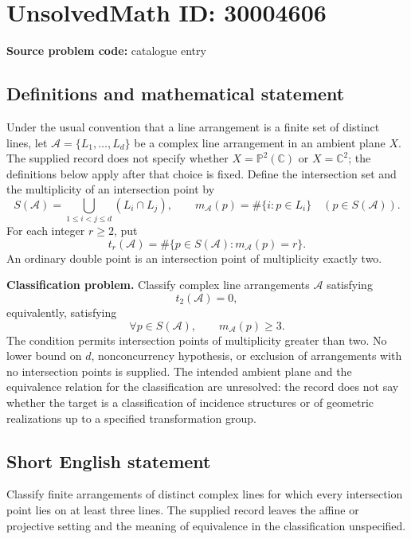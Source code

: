 \documentclass[11pt]{article}
\newcommand{\C}{\mathbb{C}}
\newcommand{\PP}{\mathbb{P}}
\begin{document}
\section*{UnsolvedMath ID: 30004606}
\textbf{Source problem code:} catalogue entry
\subsection{Definitions and mathematical statement}
Under the usual convention that a line arrangement is a finite set of distinct lines, let \(\mathcal A=\{L_1,\ldots,L_d\}\) be a complex line arrangement in an ambient plane \(X\). The supplied record does not specify whether \(X=\PP^2(\C)\) or \(X=\C^2\); the definitions below apply after that choice is fixed. Define the intersection set and the multiplicity of an intersection point by
\[
S(\mathcal A)=\bigcup_{1\le i<j\le d}(L_i\cap L_j),\qquad
m_{\mathcal A}(p)=\#\{i:p\in L_i\}\quad(p\in S(\mathcal A)).
\]
For each integer \(r\ge2\), put
\[
t_r(\mathcal A)=\#\{p\in S(\mathcal A):m_{\mathcal A}(p)=r\}.
\]
An ordinary double point is an intersection point of multiplicity exactly two.

\textbf{Classification problem.} Classify complex line arrangements \(\mathcal A\) satisfying
\[
t_2(\mathcal A)=0,
\]
equivalently, satisfying
\[
\forall p\in S(\mathcal A),\qquad m_{\mathcal A}(p)\ge3.
\]
The condition permits intersection points of multiplicity greater than two. No lower bound on \(d\), nonconcurrency hypothesis, or exclusion of arrangements with no intersection points is supplied. The intended ambient plane and the equivalence relation for the classification are unresolved: the record does not say whether the target is a classification of incidence structures or of geometric realizations up to a specified transformation group.
\subsection{Short English statement}
Classify finite arrangements of distinct complex lines for which every intersection point lies on at least three lines. The supplied record leaves the affine or projective setting and the meaning of equivalence in the classification unspecified.
\end{document}
